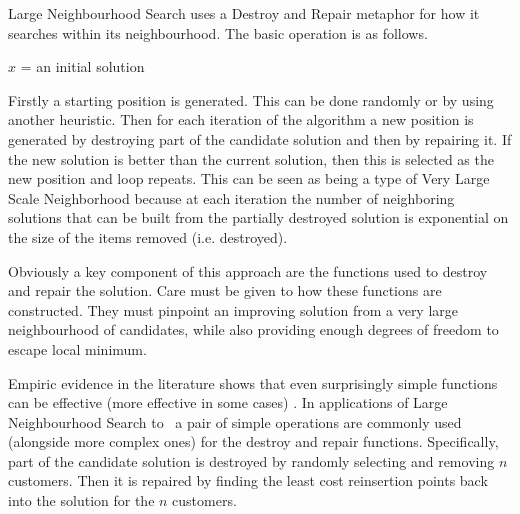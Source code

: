 Large Neighbourhood Search uses a Destroy and Repair metaphor for how it searches within its neighbourhood. The basic operation is as follows.

\begin{algorithm}
   $x$ = an initial solution\\
\end{algorithm}

Firstly a starting position is generated. This can be done randomly or by using another heuristic. Then for each iteration of the algorithm a new position is generated by destroying part of the candidate solution and then by repairing it. If the new solution is better than the current solution, then this is selected as the new position and loop repeats. This can be seen as being a type of Very Large Scale Neighborhood because at each iteration the number of neighboring solutions that can be built from the partially destroyed solution is exponential on the size of the items removed (i.e. destroyed).

Obviously a key component of this approach are the functions used to destroy and repair the solution. Care must be given to how these functions are constructed. They must pinpoint an improving solution from a very large neighbourhood of candidates, while also providing enough degrees of freedom to escape local minimum.

Empiric evidence in the literature shows that even surprisingly simple functions can be effective (more effective in some cases) \cite{Shaw:1998}\cite{Ropke:2005}. In applications of Large Neighbourhood Search to \VRP\ a pair of simple operations are commonly used (alongside more complex ones) for the destroy and repair functions. Specifically, part of the candidate solution is destroyed by randomly selecting and removing $n$ customers. Then it is repaired by finding the least cost reinsertion points back into the solution for the $n$ customers.

